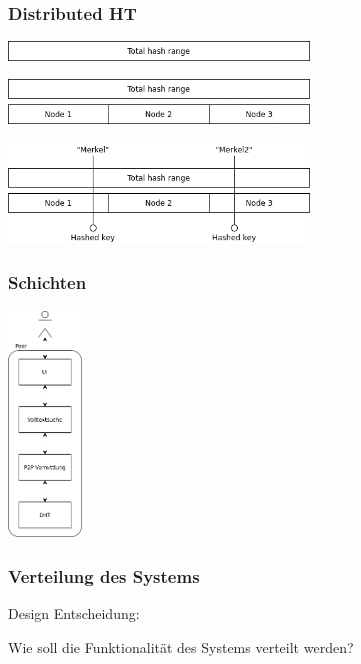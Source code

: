 \documentclass{beamer}
\begin{document}
\begin{frame}[allowframebreaks]
  \frametitle{Distributed HT}

  \includegraphics[width=8cm]{dht1}

  \break

  \includegraphics[width=8cm]{dht2}

  \break

  \includegraphics[width=8cm]{dht3}
\end{frame}

\begin{frame}
  \frametitle{Schichten}

  \begin{center}
    \includegraphics[height=6cm]{Schichten-alt}
  \end{center}
\end{frame}

\begin{frame}
  \frametitle{Verteilung des Systems}

  Design Entscheidung:

  Wie soll die Funktionalität des Systems verteilt werden?
\end{frame}
\end{document}
